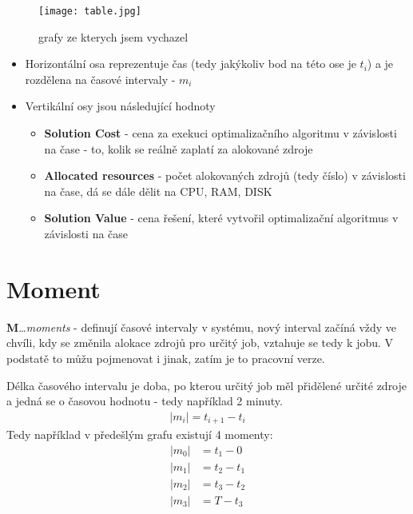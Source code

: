 \documentclass[11pt]{article}
\begin{document}
    \begin{figure}[ht!]
        \centering
        \texttt{[image: table.jpg]}
        \caption{grafy ze kterych jsem vychazel}
    \end{figure}

    \newpage

    \begin{itemize}
        \item Horizontální osa reprezentuje čas (tedy jakýkoliv bod na této ose je $t_i$) a je rozdělena na časové intervaly - $m_i$
        \item Vertikální osy jsou následující hodnoty
        \begin{itemize}
            \item \textbf{Solution Cost} - cena za exekuci optimalizačního algoritmu v závislosti na čase - to, kolik se reálně zaplatí za alokované zdroje
            \item \textbf{Allocated resources} - počet alokovaných zdrojů (tedy číslo) v závislosti na čase, dá se dále dělit na CPU, RAM, DISK
            \item \textbf{Solution Value} - cena řešení, které vytvořil optimalizační algoritmus v závislosti na čase
        \end{itemize}
    \end{itemize}

    \section{Moment}\label{sec:m}
    \textbf{M}\ldots\textit{moments} - definují časové intervaly v systému, nový interval začíná vždy ve chvíli, kdy se změnila alokace zdrojů pro určitý job,
    vztahuje se tedy k jobu. V podstatě to můžu pojmenovat i jinak, zatím je to pracovní verze.

    Délka časového intervalu je doba, po kterou určitý job měl přidělené určité zdroje a jedná se o časovou hodnotu - tedy například 2 minuty.
    \begin{align*}
        | m_i | = t_{i+1} - t_i
    \end{align*}
    Tedy například v předešlým grafu existují 4 momenty:
    \begin{align*}
        | m_0 | &= t_{1} - 0\\
        | m_1 | &= t_{2} - t_{1}\\
        | m_2 | &= t_{3} - t_{2}\\
        | m_3 | &= T - t_{3}
    \end{align*}
\end{document}
